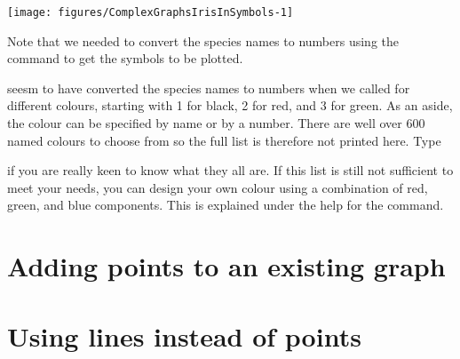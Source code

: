 \begin{exhibit} 
\begin{center} 
\caption{} 
\label{IrisInSymbols} 
\begin{knitrout}
\color{fgcolor}\begin{kframe}
\begin{alltt}
\hlstd{> }\hlopt{~}  \hlstd{=}\hlstd{,} \hlstd{=}\hlstd{,} \hlstd{=}
\end{alltt}
\end{kframe}
\texttt{[image: figures/ComplexGraphsIrisInSymbols-1]} 

\end{knitrout}
\end{center} 
\end{exhibit} 
Note that we needed to convert the species names to numbers using the  command to get the symbols to be plotted. 
 
\R{} seesm to have converted the species names to numbers when we called for different colours, starting with 1 for black, 2 for red, and 3 for green. As an aside, the colour can be specified by name or by a number. There are well over 600 named colours to choose from so the full list is therefore not printed here. Type 
\begin{knitrout}
\color{fgcolor}\begin{kframe}
\begin{alltt}
\hlstd{> }\hlstd{()}
\end{alltt}
\end{kframe}
\end{knitrout}
if you are really keen to know what they all are. If this list is still not sufficient to meet your needs, you can design your own colour using a combination of red, green, and blue components. This is explained under the help for the  command. 
 
\section{Adding points to an existing graph} 
 
\section{Using lines instead of points} \label{LinesInsteadOfPoints}  
 
